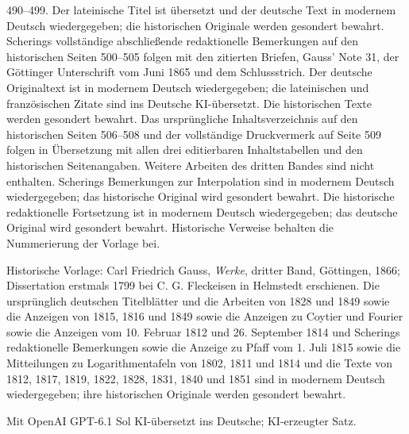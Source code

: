 490--499. Der lateinische Titel ist übersetzt und der deutsche Text in modernem Deutsch wiedergegeben; die historischen Originale werden gesondert bewahrt. Scherings vollständige abschließende redaktionelle Bemerkungen auf den historischen Seiten 500--505 folgen mit den zitierten Briefen, Gauss’ Note 31, der Göttinger Unterschrift vom Juni 1865 und dem Schlussstrich. Der deutsche Originaltext ist in modernem Deutsch wiedergegeben; die lateinischen und französischen Zitate sind ins Deutsche KI-übersetzt. Die historischen Texte werden gesondert bewahrt. Das ursprüngliche Inhaltsverzeichnis auf den historischen Seiten 506--508 und der vollständige Druckvermerk auf Seite 509 folgen in Übersetzung mit allen drei editierbaren Inhaltstabellen und den historischen Seitenangaben. Weitere Arbeiten des dritten Bandes sind nicht enthalten. Scherings Bemerkungen zur Interpolation sind in modernem Deutsch wiedergegeben; das historische Original wird gesondert bewahrt. Die historische redaktionelle Fortsetzung ist in modernem Deutsch wiedergegeben; das deutsche Original wird gesondert bewahrt. Historische Verweise behalten die Nummerierung der Vorlage bei.
\clearpage\thispagestyle{empty}\medskip
\par\medskip Historische Vorlage: Carl Friedrich Gauss, \emph{Werke}, dritter Band, Göttingen, 1866; Dissertation erstmals 1799 bei C. G. Fleckeisen in Helmstedt erschienen. Die ursprünglich deutschen Titelblätter und die Arbeiten von 1828 und 1849 sowie die Anzeigen von 1815, 1816 und 1849 sowie die Anzeigen zu Coytier und Fourier sowie die Anzeigen vom 10. Februar 1812 und 26. September 1814 und Scherings redaktionelle Bemerkungen sowie die Anzeige zu Pfaff vom 1. Juli 1815 sowie die Mitteilungen zu Logarithmentafeln von 1802, 1811 und 1814 und die Texte von 1812, 1817, 1819, 1822, 1828, 1831, 1840 und 1851 sind in modernem Deutsch wiedergegeben; ihre historischen Originale werden gesondert bewahrt.
\par\medskip Mit OpenAI GPT-6.1 Sol KI-übersetzt ins Deutsche; KI-erzeugter Satz.
\par\endgroup\clearpage


